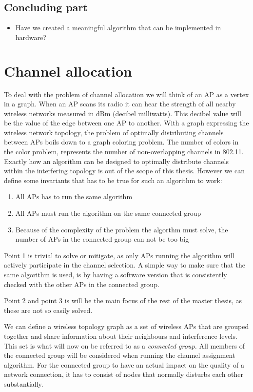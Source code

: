 \documentclass[a4paper,UKenglish]{report}
\begin{document}
\subsection {Concluding part}
\begin{itemize} 
	\item Have we created a meaningful algorithm that can be implemented in hardware?
\end{itemize}

\clearpage

\section{Channel allocation} 
To deal with the problem of channel allocation we will think of an AP as a vertex in a graph. When an AP scans its radio
it can hear the strength of all nearby wireless networks measured in dBm (decibel milliwatts). This decibel value will be
the value of the edge between one AP to another. With a graph expressing the wireless network topology, the problem
of optimally distributing channels between APs boils down to a graph coloring problem. The number of colors in the color problem,
represents the number of non-overlapping channels in 802.11. Exactly how an algorithm can be designed to optimally distribute channels within the
interfering topology is out of the scope of this thesis. However we can define some invariants that has to be true
for such an algorithm to work:
\begin{enumerate} 
	\item All APs has to run the same algorithm
	\item All APs must run the algorithm on the same connected group
	\item Because of the complexity of the problem the algorthm must solve, the number of APs in the connected group can not be too big
\end{enumerate}

Point 1 is trivial to solve or mitigate, as only APs running the algorithm will actively participate in the channel selection. A simple way to make sure that the
same algorithm is used, is by having a software version that is consistently checked with the other APs in the connected group.

Point 2 and point 3 is will be the main focus of the rest of the master thesis, as these are not so easily solved.

We can define a wireless topology graph as a set of wireless APs that are grouped together and share information about their neighbours and interference levels.
This set is what will now on be referred to as a \textit{connected group.} All members of the connected group will be considered when running the channel assignment algorithm.
For the connected group to have an actual impact on the quality of a network connection, it has to consist of nodes that normally disturbs each other substantially.
\end{document}
